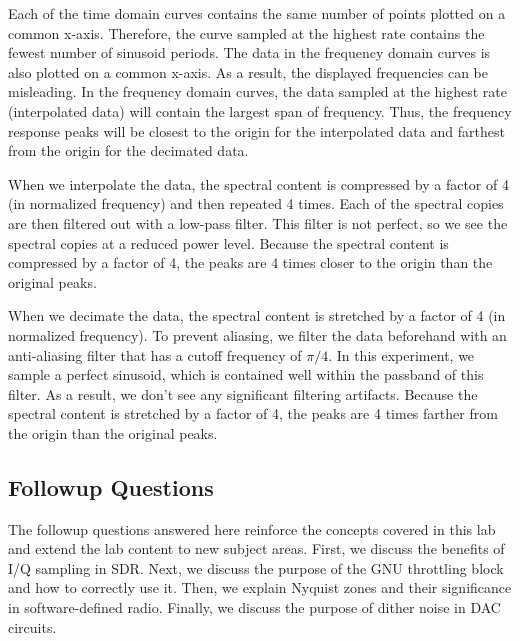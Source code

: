 \documentclass{article}
\begin{document}
Each of the time domain curves contains the same number of points plotted on a common x-axis. Therefore, the curve sampled at the highest rate contains the fewest number of sinusoid periods. The data in the frequency domain curves is also plotted on a common x-axis. As a result, the displayed frequencies can be misleading. In the frequency domain curves, the data sampled at the highest rate (interpolated data) will contain the largest span of frequency. Thus, the frequency response peaks will be closest to the origin for the interpolated data and farthest from the origin for the decimated data. 

When we interpolate the data, the spectral content is compressed by a factor of 4 (in normalized frequency) and then repeated 4 times. Each of the spectral copies are then filtered out with a low-pass filter. This filter is not perfect, so we see the spectral copies at a reduced power level. Because the spectral content is compressed by a factor of 4, the peaks are 4 times closer to the origin than the original peaks.

When we decimate the data, the spectral content is stretched by a factor of 4 (in normalized frequency). To prevent aliasing, we filter the data beforehand with an anti-aliasing filter that has a cutoff frequency of $\pi/4$.  In this experiment, we sample a perfect sinusoid, which is contained well within the passband of this filter. As a result, we don't see any significant filtering artifacts. Because the spectral content is stretched by a factor of 4, the peaks are 4 times farther from the origin than the original peaks.

\subsection{Followup Questions}

The followup questions answered here reinforce the concepts covered in this lab and extend the lab content to new subject areas. First, we discuss the benefits of I/Q sampling in SDR. Next, we discuss the purpose of the GNU throttling block and how to correctly use it. Then, we explain Nyquist zones and their significance in software-defined radio. Finally, we discuss the purpose of dither noise in DAC circuits.


\end{document}
